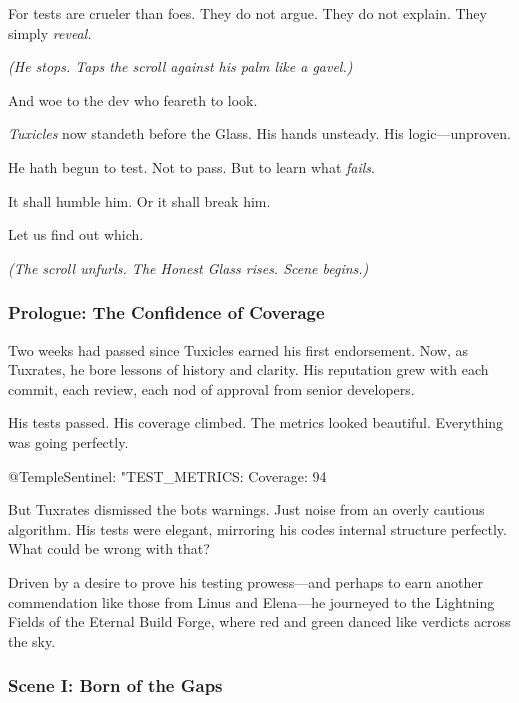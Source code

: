 For tests are crueler than foes. They do not argue. They do not explain. They simply \emph{reveal.}

\emph{(He stops. Taps the scroll against his palm like a gavel.)}

And woe to the dev who feareth to look.

\emph{Tuxicles} now standeth before the Glass. His hands unsteady. His logic---unproven.

He hath begun to test. Not to pass. But to learn what \emph{fails}.

It shall humble him. Or it shall break him.

Let us find out which.

\emph{(The scroll unfurls. The Honest Glass rises. Scene begins.)}

\bookdivider

\subsubsection{Prologue: The Confidence of Coverage}\label{prologue-the-confidence-of-coverage}

Two weeks had passed since Tuxicles earned his first endorsement. Now, as Tuxrates, he bore lessons of history and clarity. His reputation grew with each commit, each review, each nod of approval from senior developers.

His tests passed. His coverage climbed. The metrics looked beautiful. Everything was going perfectly.

\begin{codeblock}
@TempleSentinel: "TEST_METRICS: Coverage: 94%
\end{codeblock}

But Tuxrates dismissed the bot\textquotesingle s warnings. Just noise from an overly cautious algorithm. His tests were elegant, mirroring his code\textquotesingle s internal structure perfectly. What could be wrong with that?

Driven by a desire to prove his testing prowess---and perhaps to earn another commendation like those from Linus and Elena---he journeyed to the Lightning Fields of the Eternal Build Forge, where red and green danced like verdicts across the sky.

\bookdivider

\subsubsection{Scene I: Born of the Gaps}\label{scene-i-born-of-the-gaps}

